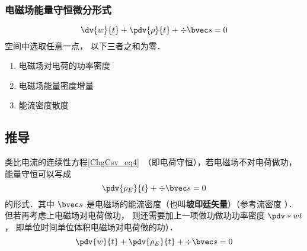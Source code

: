 \subsubsection{电磁场能量守恒微分形式}
\begin{equation}
\dv{w}{t} + \pdv{\rho}{t} + \div \bvec s = 0
\end{equation} 
空间中选取任意一点， 以下三者之和为零．
\begin{enumerate}
\item 电磁场对电荷的功率密度
\item 电磁场能量密度增量
\item 能流密度散度
\end{enumerate}

\subsection{推导}
类比电流的连续性方程\autoref{ChgCsv_eq4}~（即电荷守恒），若电磁场不对电荷做功，能量守恒可以写成
\begin{equation}
\pdv{\rho_E}{t} + \div \bvec s = 0
\end{equation} 
的形式．其中 $\bvec s$ 是电磁场的能流密度（也叫\textbf{坡印廷矢量}）（参考流密度%
）．但若再考虑上电磁场对电荷做功， 则还需要加上一项做功做功功率密度 $\pdv*{w}{t}$， 即单位时间单位体积电磁场对电荷做的功）．
\begin{equation}\label{EBS_eq1}
\pdv{w}{t} + \pdv{\rho_E}{t} + \div \bvec s = 0
\end{equation} 

